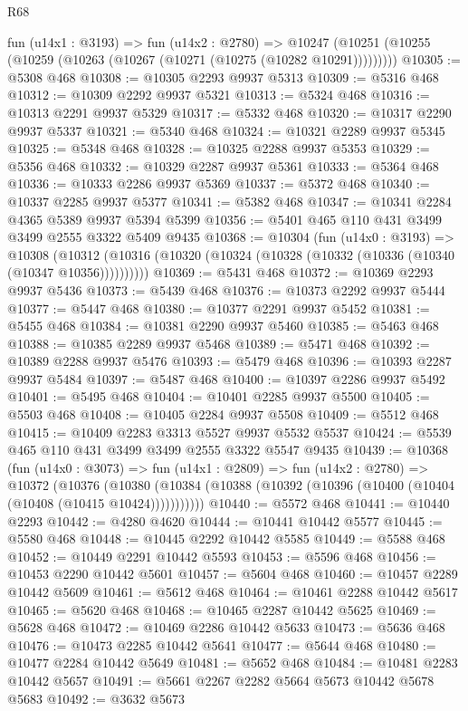 \begin{lexlean}{R68}
\begin{coremodule}
    fun (u14x1 : @3193) =>
    fun (u14x2 : @2780) =>
    @10247 (@10251 (@10255 (@10259 (@10263 (@10267 (@10271 (@10275 (@10282 @10291)))))))))
@10305 := @5308 @468
@10308 := @10305 @2293 @9937 @5313
@10309 := @5316 @468
@10312 := @10309 @2292 @9937 @5321
@10313 := @5324 @468
@10316 := @10313 @2291 @9937 @5329
@10317 := @5332 @468
@10320 := @10317 @2290 @9937 @5337
@10321 := @5340 @468
@10324 := @10321 @2289 @9937 @5345
@10325 := @5348 @468
@10328 := @10325 @2288 @9937 @5353
@10329 := @5356 @468
@10332 := @10329 @2287 @9937 @5361
@10333 := @5364 @468
@10336 := @10333 @2286 @9937 @5369
@10337 := @5372 @468
@10340 := @10337 @2285 @9937 @5377
@10341 := @5382 @468
@10347 := @10341 @2284 @4365 @5389 @9937 @5394 @5399
@10356 := @5401 @465 @110 @431 @3499 @3499 @2555 @3322 @5409 @9435
@10368 := @10304
    (fun (u14x0 : @3193) =>
    @10308 (@10312 (@10316 (@10320 (@10324 (@10328 (@10332 (@10336 (@10340 (@10347 @10356))))))))))
@10369 := @5431 @468
@10372 := @10369 @2293 @9937 @5436
@10373 := @5439 @468
@10376 := @10373 @2292 @9937 @5444
@10377 := @5447 @468
@10380 := @10377 @2291 @9937 @5452
@10381 := @5455 @468
@10384 := @10381 @2290 @9937 @5460
@10385 := @5463 @468
@10388 := @10385 @2289 @9937 @5468
@10389 := @5471 @468
@10392 := @10389 @2288 @9937 @5476
@10393 := @5479 @468
@10396 := @10393 @2287 @9937 @5484
@10397 := @5487 @468
@10400 := @10397 @2286 @9937 @5492
@10401 := @5495 @468
@10404 := @10401 @2285 @9937 @5500
@10405 := @5503 @468
@10408 := @10405 @2284 @9937 @5508
@10409 := @5512 @468
@10415 := @10409 @2283 @3313 @5527 @9937 @5532 @5537
@10424 := @5539 @465 @110 @431 @3499 @3499 @2555 @3322 @5547 @9435
@10439 := @10368
    (fun (u14x0 : @3073) =>
    fun (u14x1 : @2809) =>
    fun (u14x2 : @2780) =>
    @10372
      (@10376
        (@10380 (@10384 (@10388 (@10392 (@10396 (@10400 (@10404 (@10408 (@10415 @10424)))))))))))
@10440 := @5572 @468
@10441 := @10440 @2293
@10442 := @4280 @4620
@10444 := @10441 @10442 @5577
@10445 := @5580 @468
@10448 := @10445 @2292 @10442 @5585
@10449 := @5588 @468
@10452 := @10449 @2291 @10442 @5593
@10453 := @5596 @468
@10456 := @10453 @2290 @10442 @5601
@10457 := @5604 @468
@10460 := @10457 @2289 @10442 @5609
@10461 := @5612 @468
@10464 := @10461 @2288 @10442 @5617
@10465 := @5620 @468
@10468 := @10465 @2287 @10442 @5625
@10469 := @5628 @468
@10472 := @10469 @2286 @10442 @5633
@10473 := @5636 @468
@10476 := @10473 @2285 @10442 @5641
@10477 := @5644 @468
@10480 := @10477 @2284 @10442 @5649
@10481 := @5652 @468
@10484 := @10481 @2283 @10442 @5657
@10491 := @5661 @2267 @2282 @5664 @5673 @10442 @5678 @5683
@10492 := @3632 @5673

\end{coremodule}
\end{lexlean}
